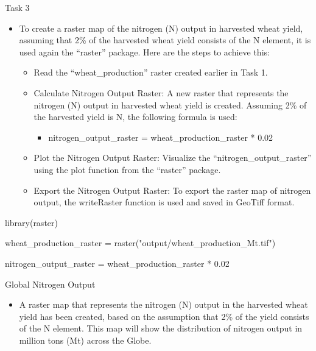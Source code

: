 \documentclass[
  ignorenonframetext,
  aspectratio=169,
]{beamer}
\newenvironment{Shaded}{\begin{snugshade}}{\end{snugshade}}
\newcommand{\FloatTok}[1]{\textcolor[rgb]{0.68,0.00,0.00}{#1}}
\newcommand{\FunctionTok}[1]{\textcolor[rgb]{0.28,0.35,0.67}{#1}}
\newcommand{\NormalTok}[1]{\textcolor[rgb]{0.00,0.23,0.31}{#1}}
\newcommand{\OtherTok}[1]{\textcolor[rgb]{0.00,0.23,0.31}{#1}}
\newcommand{\SpecialCharTok}[1]{\textcolor[rgb]{0.37,0.37,0.37}{#1}}
\newcommand{\StringTok}[1]{\textcolor[rgb]{0.13,0.47,0.30}{#1}}
\providecommand{\tightlist}{%
  \setlength{\itemsep}{0pt}\setlength{\parskip}{0pt}}\usepackage{longtable,booktabs,array}
\begin{document}
\begin{frame}[fragile]{Task 3}
\protect\hypertarget{task-3}{}
\begin{itemize}[<+->]
\item
  To create a raster map of the nitrogen (N) output in harvested wheat
  yield, assuming that 2\% of the harvested wheat yield consists of the
  N element, it is used again the ``raster'' package. Here are the steps
  to achieve this:

  \begin{itemize}[<+->]
  \item
    Read the ``wheat\_production'' raster created earlier in Task 1.
  \item
    Calculate Nitrogen Output Raster: A new raster that represents the
    nitrogen (N) output in harvested wheat yield is created. Assuming
    2\% of the harvested yield is N, the following formula is used:

    \begin{itemize}[<+->]
    \tightlist
    \item
      nitrogen\_output\_raster = wheat\_production\_raster * 0.02
    \end{itemize}
  \item
    Plot the Nitrogen Output Raster: Visualize the
    ``nitrogen\_output\_raster'' using the plot function from the
    ``raster'' package.
  \item
    Export the Nitrogen Output Raster: To export the raster map of
    nitrogen output, the writeRaster function is used and saved in
    GeoTiff format.
  \end{itemize}
\end{itemize}

\linespread{0.5}

\begin{Shaded}
\begin{Highlighting}[]
\FunctionTok{library}\NormalTok{(raster)}

\NormalTok{wheat\_production\_raster }\OtherTok{=} \FunctionTok{raster}\NormalTok{(}\StringTok{"output/wheat\_production\_Mt.tif"}\NormalTok{)}

\NormalTok{nitrogen\_output\_raster }\OtherTok{=}\NormalTok{ wheat\_production\_raster }\SpecialCharTok{*} \FloatTok{0.02}
\end{Highlighting}
\end{Shaded}

\linespread{2}
\end{frame}

\begin{frame}{Global Nitrogen Output}
\protect\hypertarget{global-nitrogen-output}{}
\begin{itemize}[<+->]
\tightlist
\item
  A raster map that represents the nitrogen (N) output in the harvested
  wheat yield has been created, based on the assumption that 2\% of the
  yield consists of the N element. This map will show the distribution
  of nitrogen output in million tons (Mt) across the Globe.
\end{itemize}
\end{frame}
\end{document}
